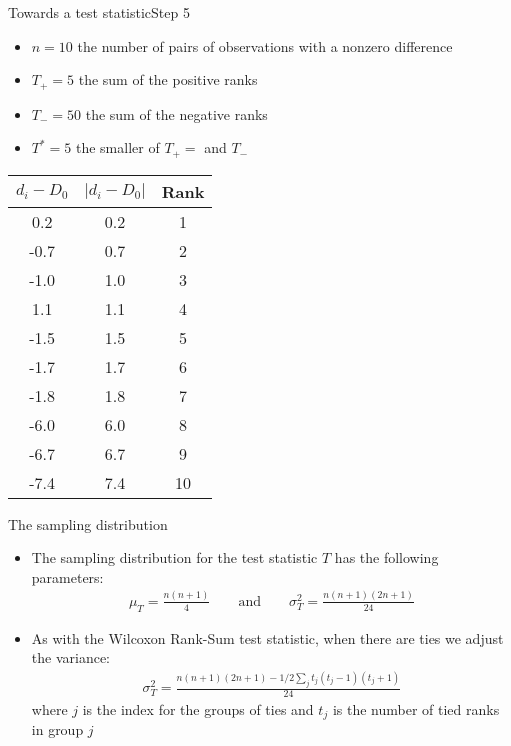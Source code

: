 \documentclass[xcolor=dvipsnames]{beamer}
\begin{document}
\begin{frame}{Towards a test statistic}{Step 5}
\begin{itemize}
	\item $n = 10$ the number of pairs of observations with a nonzero difference \pause
	\item $T_+ = 5$  the sum of the positive ranks \pause
	\item $T_- = 50$ the sum of the negative ranks \pause
	\item $T^* = 5$ the smaller of $T_+ = $ and $T_-$  \pause
\end{itemize}
{\tiny
\begin{center}
	\begin{tabular}{|c|c|c|}
		\hline
		$d_i -D_0$ & \textbf{$|d_i - D_0|$} &  \textbf{Rank}  \\ \hline \hline
		0.2 & 0.2 &     1\\ \hline
		-0.7  &0.7  &    2\\ \hline
		-1.0  &1.0  &    3\\ \hline
		1.1  & 1.1  &    4\\ \hline
		-1.5  & 1.5  &    5\\ \hline
		-1.7  &1.7  &    6\\ \hline
		-1.8  & 1.8  &    7\\ \hline
		-6.0  & 6.0  &    8\\ \hline
		-6.7  & 6.7  &    9\\ \hline
		-7.4  &7.4  &   10\\ \hline
	\end{tabular}
\end{center}}
\end{frame}

\begin{frame}{The sampling distribution}
	\begin{itemize}
		\item The sampling distribution for the test statistic $T$ has the following parameters: \pause
		\begin{gather*}
			\mu_{T} = \frac{n (n+1)}{4} \quad \quad \text{and} \quad \quad \sigma_{T}^2 = \frac{n(n+1)(2n+1)}{24}
		\end{gather*} \pause
		\item As with the Wilcoxon Rank-Sum test statistic, when there are ties we adjust the variance: \pause
		\begin{gather*}
			\sigma_{T}^2 = \frac{n(n+1)(2n+1)-1/2 \sum_j t_j (t_j-1)(t_j+1)}{24}
		\end{gather*}
		where $j$ is the index for the groups of ties and $t_j$ is the number of tied ranks in group $j$
	\end{itemize}
\end{frame}
\end{document}
